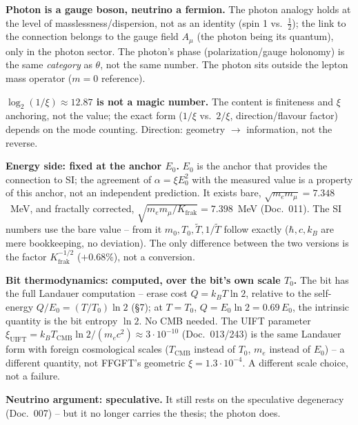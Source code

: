 \textbf{Photon is a gauge boson, neutrino a fermion.} The photon analogy holds at the level of
masslessness/dispersion, not as an identity (spin 1 vs.\ $\tfrac12$); the link to the connection belongs to the gauge field $A_\mu$ (the photon being its quantum), only
in the photon sector. The photon's phase (polarization/gauge holonomy) is the same \emph{category} as $\theta$,
not the same number. The photon sits outside the lepton mass operator ($m=0$ reference).

\textbf{$\log_2(1/\xi)\approx12.87$ is not a magic number.} The content is finiteness and $\xi$
anchoring, not the value; the exact form ($1/\xi$ vs.\ $2/\xi$, direction/flavour factor) depends on the
mode counting. Direction: geometry $\to$ information, not the reverse.

\textbf{Energy side: fixed at the anchor $E_0$.} $E_0$ is the anchor that provides the connection to SI;
the agreement of $\alpha=\xi E_0^2$ with the measured value is a property of this anchor, not an
independent prediction. It exists bare, $\sqrt{m_e m_\mu}=7.348$~MeV, and fractally corrected,
$\sqrt{m_e m_\mu/K_{\text{frak}}}=7.398$~MeV (Doc.~011). The SI numbers use the bare value -- from it
$m_0,T_0,\tilde T,1/\tilde T$ follow exactly ($\hbar,c,k_B$ are mere bookkeeping, no deviation). The only
difference between the two versions is the factor $K_{\text{frak}}^{-1/2}$ ($+0.68\%$), not a
conversion.

\textbf{Bit thermodynamics: computed, over the bit's own scale $T_0$.} The bit has the full Landauer
computation -- erase cost $Q=k_B T\ln2$, relative to the self-energy $Q/E_0=(T/T_0)\ln2$ (\S7); at
$T=T_0$, $Q=E_0\ln2=0.69\,E_0$, the intrinsic quantity is the bit entropy $\ln2$. No CMB needed. The UIFT
parameter $\xi_\text{UIFT}=k_B T_\text{CMB}\ln2/(m_e c^2)\approx3\cdot10^{-10}$ (Doc.~013/243) is the same
Landauer form with foreign cosmological scales ($T_\text{CMB}$ instead of $T_0$, $m_e$ instead of $E_0$)
-- a different quantity, not FFGFT's geometric $\xi=1.3\cdot10^{-4}$. A different scale choice, not a
failure.

\textbf{Neutrino argument: speculative.} It still rests on the speculative degeneracy (Doc.~007) -- but it
no longer carries the thesis; the photon does.

